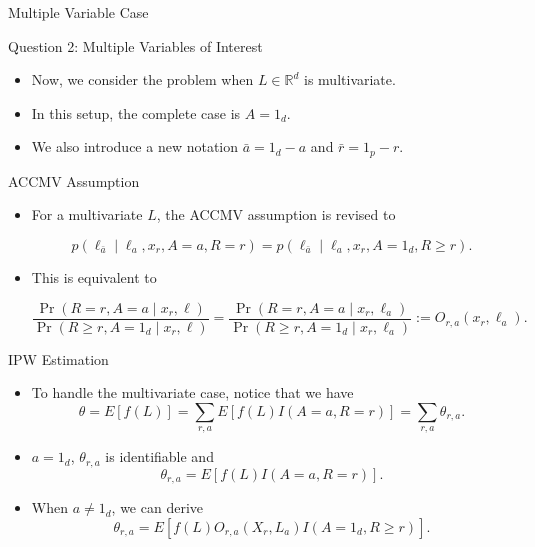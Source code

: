 \documentclass{beamer} %
\newcommand{\R}{\ensuremath{\mathbb{R}}}
\begin{document}
\begin{frame}

  \begin{center}
    \Large
    Multiple Variable Case
  \end{center}

\end{frame}

\begin{frame}{Question 2: Multiple Variables of Interest}
  \begin{itemize}
    \item Now, we consider the problem when $L \in \R^d$ is multivariate.
    \item In this setup, the complete case is $A = 1_d$.
    \item We also introduce a new notation $\bar a = 1_d - a$ and $\bar r = 1_p
      - r$.
  \end{itemize}
\end{frame}

\begin{frame}{ACCMV Assumption}
  \begin{itemize}
    \item For a multivariate $L$, the ACCMV assumption is revised to

      \[p(\ell_{\bar a} \mid \ell_{a}, x_r, A = a, R = r) = 
        p(\ell_{\bar a} \mid \ell_{a}, x_r, A = 1_d, R \geq r).
        \]

      \item This is equivalent to

      {\small
      \[\frac{\Pr(R = r, A = a \mid x_r, \ell)}{\Pr(R \geq r, A = 1_d \mid
        x_r, \ell)} = 
        \frac{\Pr(R = r, A = a \mid x_r, \ell_a)}{\Pr(R \geq r, A = 1_d \mid
        x_r, \ell_a)} := O_{r, a}(x_r, \ell_a).\]
      }
  \end{itemize}
\end{frame}

\begin{frame}{IPW Estimation}
  \begin{itemize}
    \item To handle the multivariate case, notice that we have
      \[\theta = E[f(L)] = \sum_{r, a}E[f(L)I(A = a, R = r)] = \sum_{r, a}
        \theta_{r,a}.\]
      \item $a = 1_d$, $\theta_{r,a}$ is identifiable and 
        \[\theta_{r,a} = E[f(L)I(A = a, R = r)].\]
      \item When $a \neq 1_d$, we can derive
        \[\theta_{r,a} = E[f(L)O_{r,a}(X_r, L_a)I(A = 1_d, R \geq r)].\]
  \end{itemize}
\end{frame}
\end{document}
